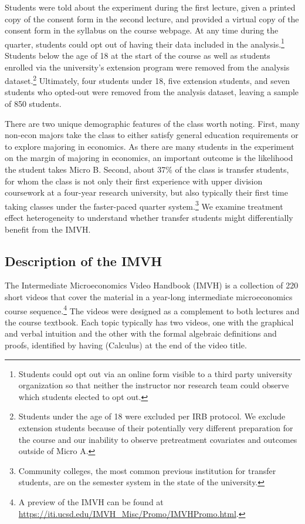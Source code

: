\documentclass[12pt]{article}
\begin{document}
Students were told about the experiment during the first lecture, given a printed copy of the consent form in the second lecture, and provided a virtual copy of the consent form in the syllabus on the course webpage. At any time during the quarter, students could opt out of having their data included in the analysis.\footnote{Students could opt out via an online form visible to a third party university organization so that neither the instructor nor research team could observe which students elected to opt out.} Students below the age of 18 at the start of the course as well as students enrolled via the university's extension program were removed from the analysis dataset.\footnote{Students under the age of 18 were excluded per IRB protocol. We exclude extension students because of their potentially very different preparation for the course and our inability to observe pretreatment covariates and outcomes outside of Micro A.} Ultimately, four students under 18, five extension students, and seven students who opted-out were removed from the analysis dataset, leaving a sample of 850 students.

There are two unique demographic features of the class worth noting. First, many non-econ majors take the class to either satisfy general education requirements or to explore majoring in economics. As there are many students in the experiment on the margin of majoring in economics, an important outcome is the likelihood the student takes Micro B. Second, about 37\% of the class is transfer students, for whom the class is not only their first experience with upper division coursework at a four-year research university, but also typically their first time taking classes under the faster-paced quarter system.\footnote{Community colleges, the most common previous institution for transfer students, are on the semester system in the state of the university.} We examine treatment effect heterogeneity to understand whether transfer students might differentially benefit from the IMVH.

\subsection{Description of the IMVH}

The Intermediate Microeconomics Video Handbook (IMVH) is a collection of 220 short videos that cover the material in a year-long intermediate microeconomics course sequence.\footnote{A preview of the IMVH can be found at \url{https://iti.ucsd.edu/IMVH_Misc/Promo/IMVHPromo.html}.} The videos were designed as a complement to both lectures and the course textbook. Each topic typically has two videos, one with the graphical and verbal intuition and the other with the formal algebraic definitions and proofs, identified by having (Calculus) at the end of the video title.
\end{document}
